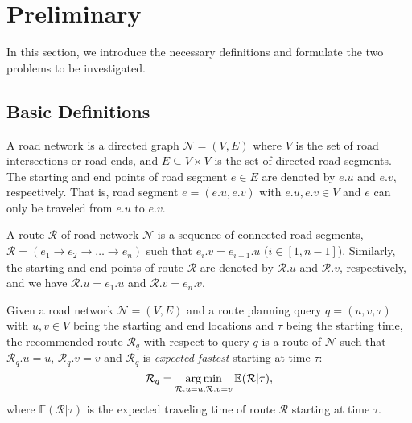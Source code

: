 \section{Preliminary}
\label{sec-preliminary}

In this section, we introduce the necessary definitions %
and formulate the two problems to be investigated.

\subsection{Basic Definitions}
\label{subsec-definition}

\begin{definition}A road network is a directed graph $\mathcal{N}=(V, E)$ where $V$ is the set of road intersections or road ends, and $E\subseteq V\times V$ is the set of directed road segments.
The starting and end points of road segment $e\in E$ are denoted by $e.u$ and $e.v$, respectively. That is, road segment $e=(e.u, e.v)$ with $e.u, e.v\in V$ and $e$ can only be traveled from $e.u$ to $e.v$.
\end{definition}

\begin{definition}[Route]A route $\mathcal{R}$ of road network $\mathcal{N}$ is a sequence of connected road segments, $\mathcal{R} = (e_1 \rightarrow e_2 \rightarrow \dots \rightarrow e_n)$ such that $e_i.v=e_{i+1}.u$ ($i\in[1, n-1]$). Similarly, the starting and end points of route $\mathcal{R}$ are denoted by $\mathcal{R}.u$ and $\mathcal{R}.v$, respectively, and we have $\mathcal{R}.u=e_1.u$ and $\mathcal{R}.v=e_n.v$.
\end{definition}

\begin{definition}Given a road network $\mathcal{N}=(V, E)$ and a route planning query $q=(u, v, \tau)$ with $u,v\in V$ being the starting and end locations and $\tau$ being the starting time, the recommended route $\mathcal{R}_q$ with respect to query $q$ is a route of $\mathcal{N}$ such that $\mathcal{R}_q.u=u$, $\mathcal{R}_q.v=v$ and $\mathcal{R}_q$ is {\em expected fastest} starting at time $\tau$:
\begin{equation} \label{eq-expected}
\mathcal{R}_q = \operatorname*{arg\,min}_{\mathcal{R}.u=u, \mathcal{R}.v=v} \mathbb{E}(\mathcal{R}|\tau),
\end{equation}
where $\mathbb{E}(\mathcal{R}|\tau)$ is the expected traveling time of route $\mathcal{R}$ starting at time $\tau$.
\end{definition}

